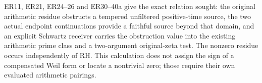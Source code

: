 ER11, ER21, ER24--26 and ER30--40a give the exact relation sought:
the original arithmetic residue obstructs a tempered unfiltered
positive-time source, the two actual endpoint continuations provide
a faithful source beyond that domain, and an explicit Schwartz
receiver carries the obstruction value into the existing arithmetic
prime class and a two-argument original-zeta test. The nonzero
residue occurs independently of RH. This calculation does not
assign the sign of a compensated Weil form or locate a nontrivial
zero; those require their own evaluated arithmetic pairings.
